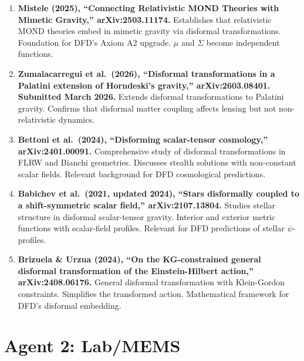 \documentclass[11pt]{article}
\begin{document}
\begin{tcolorbox}[colback=green!5!white, colframe=green!50!black,
  title=\textbf{Agent 1: NEW LITERATURE REVIEWED}]

\begin{enumerate}

\item \textbf{Mistele (2025), ``Connecting Relativistic MOND
  Theories with Mimetic Gravity,'' arXiv:2503.11174.}
  Establishes that relativistic MOND theories embed in mimetic
  gravity via disformal transformations. Foundation for DFD's
  Axiom A2 upgrade. $\mu$ and $\Sigma$ become independent functions.

\item \textbf{Zumalacarregui et al.\ (2026), ``Disformal
  transformations in a Palatini extension of Horndeski's gravity,''
  arXiv:2603.08401. Submitted March 2026.}
  Extends disformal transformations to Palatini gravity. Confirms
  that disformal matter coupling affects lensing but not
  non-relativistic dynamics.

\item \textbf{Bettoni et al.\ (2024), ``Disforming scalar-tensor
  cosmology,'' arXiv:2401.00091.}
  Comprehensive study of disformal transformations in FLRW and
  Bianchi geometries. Discusses stealth solutions with non-constant
  scalar fields. Relevant background for DFD cosmological predictions.

\item \textbf{Babichev et al.\ (2021, updated 2024), ``Stars
  disformally coupled to a shift-symmetric scalar field,''
  arXiv:2107.13804.}
  Studies stellar structure in disformal scalar-tensor gravity.
  Interior and exterior metric functions with scalar-field profiles.
  Relevant for DFD predictions of stellar $\psi$-profiles.

\item \textbf{Brizuela \& Urzua (2024), ``On the KG-constrained
  general disformal transformation of the Einstein-Hilbert action,''
  arXiv:2408.06176.}
  General disformal transformation with Klein-Gordon constraints.
  Simplifies the transformed action. Mathematical framework for
  DFD's disformal embedding.

\end{enumerate}
\end{tcolorbox}


\section{Agent 2: Lab/MEMS}
\end{document}
